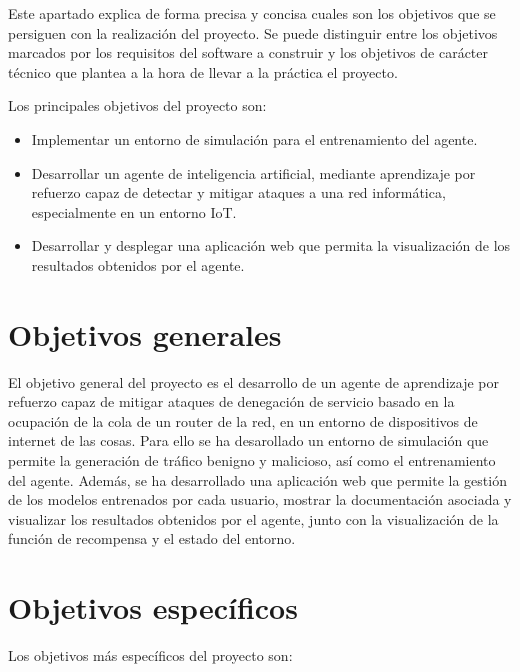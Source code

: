 
Este apartado explica de forma precisa y concisa cuales son los objetivos que se persiguen con la realización del proyecto. Se puede distinguir entre los objetivos marcados por los requisitos del software a construir y los objetivos de carácter técnico que plantea a la hora de llevar a la práctica el proyecto.

Los principales objetivos del proyecto son:
\begin{itemize}
    \item Implementar un entorno de simulación para el entrenamiento del agente.
    \item Desarrollar un agente de inteligencia artificial, mediante aprendizaje por refuerzo capaz de detectar y mitigar ataques a una red informática, especialmente en un entorno IoT.
    \item Desarrollar y desplegar una aplicación web que permita la visualización de los resultados obtenidos por el agente.
\end{itemize}

\section{Objetivos generales}
El objetivo general del proyecto es el desarrollo de un agente de aprendizaje por refuerzo capaz de mitigar ataques de denegación de servicio basado en la ocupación de la cola de un router de la red, en un entorno de dispositivos de internet de las cosas. Para ello se ha desarollado un entorno de simulación que permite la generación de tráfico benigno y malicioso, así como el entrenamiento del agente. Además, se ha desarrollado una aplicación web que permite la gestión de los modelos entrenados por cada usuario, mostrar la documentación asociada y visualizar los resultados obtenidos por el agente, junto con la visualización de la función de recompensa y el estado del entorno.

\section{Objetivos específicos}
Los objetivos más específicos del proyecto son:

